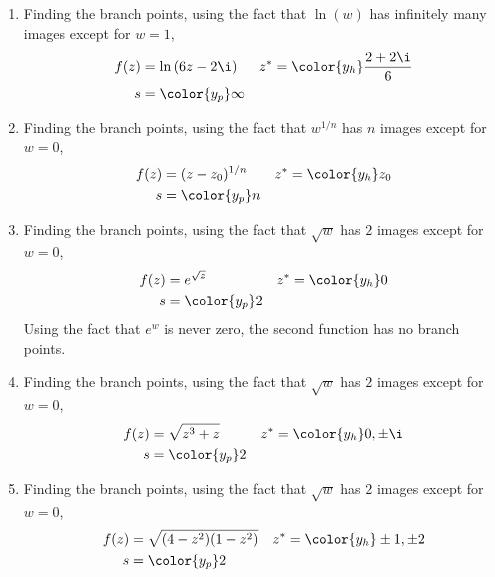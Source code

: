 \begin{enumerate}
    \item Finding the branch points, using the fact that $ \ln(w) $ has infinitely many
          images except for $ w = 1 $,
          \begin{align}
              f(z) & = \ln{(6z - 2\i)}               &
              z^*  & = \color{y_h} \frac{2 + 2\i}{6}   \\
              s    & = \color{y_p} \infty
          \end{align}

    \item Finding the branch points, using the fact that $ w^{1/n} $ has $ n $
          images except for $ w = 0 $,
          \begin{align}
              f(z) & = (z - z_0)^{1/n} &
              z^*  & = \color{y_h} z_0   \\
              s    & = \color{y_p} n
          \end{align}

    \item Finding the branch points, using the fact that $ \sqrt{w} $ has $ 2 $
          images except for $ w = 0 $,
          \begin{align}
              f(z) & = e^{\sqrt{z}}  &
              z^*  & = \color{y_h} 0   \\
              s    & = \color{y_p} 2
          \end{align}
          Using the fact that $ e^w $ is never zero, the second function has no
          branch points.

    \item Finding the branch points, using the fact that $ \sqrt{w} $ has $ 2 $
          images except for $ w = 0 $,
          \begin{align}
              f(z) & = \sqrt{z^3 + z}        &
              z^*  & = \color{y_h} 0, \pm \i   \\
              s    & = \color{y_p} 2
          \end{align}

    \item Finding the branch points, using the fact that $ \sqrt{w} $ has $ 2 $
          images except for $ w = 0 $,
          \begin{align}
              f(z) & = \sqrt{(4 - z^2)(1 - z^2)} &
              z^*  & = \color{y_h} \pm 1, \pm 2    \\
              s    & = \color{y_p} 2
          \end{align}
\end{enumerate}